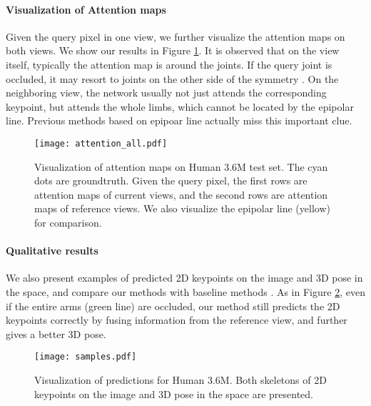 \documentclass{bmvc2k}
\begin{document}
\vspace{-0.8em}
\paragraph{Visualization of Attention maps}
Given the query pixel in one view, we further visualize the attention maps on both views. We show our results in Figure \ref{fig:more_att_map}.
It is observed that on the view itself, typically the attention map is around the joints. If the query joint is occluded, it may resort to joints on the other side of the symmetry \cite{yang2020transpose}. On the neighboring view, the network usually not just attends the corresponding keypoint, but attends the whole limbs, which cannot be located by the epipolar line. Previous methods based on epipoar line \cite{he2020epipolar} actually miss this important clue.  


\begin{figure}[!ht]
    \centering
    \texttt{[image: attention\_all.pdf]}
    \vspace{-1 em}
    \caption{\footnotesize{Visualization of attention maps on Human 3.6M test set. The cyan dots are groundtruth. Given the query pixel, the first rows are attention maps of current views, and the second rows are attention maps of reference views. We also visualize the epipolar line (yellow) for comparison. }}
    \label{fig:more_att_map}
\end{figure}


\vspace{-0.8em}
\paragraph{Qualitative results }
We also present examples of predicted 2D keypoints on the image and 3D pose in the space, and compare our methods with baseline methods \cite{qiu2019cross}. As in Figure \ref{fig:examples_2d_3d}, even if the entire arms (green line) are occluded, our method still predicts the 2D keypoints correctly by fusing information from the reference view, and further gives a better 3D pose.   


\begin{figure}[!ht]
    \centering
    \texttt{[image: samples.pdf]}
    \vspace{-1 em}
    \caption{\footnotesize{Visualization of predictions for Human 3.6M. Both skeletons of 2D keypoints on the image and 3D pose in the space are presented. }}
    \label{fig:examples_2d_3d}
\end{figure}
\end{document}
